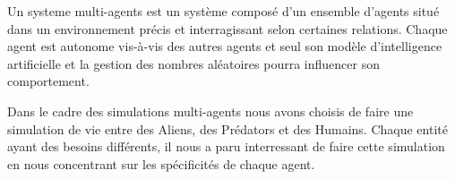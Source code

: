 Un systeme multi-agents est un système composé d'un ensemble d'agents situé dans un environnement précis et interragissant selon certaines relations. Chaque agent est autonome vis-à-vis des autres agents et seul son modèle d'intelligence artificielle et la gestion des nombres aléatoires pourra influencer son comportement. 

Dans le cadre des simulations multi-agents nous avons choisis de faire une simulation de vie entre des Aliens, des Prédators et des Humains. Chaque entité ayant des besoins différents, il nous a paru interressant de faire cette simulation en nous concentrant sur les spécificités de chaque agent.